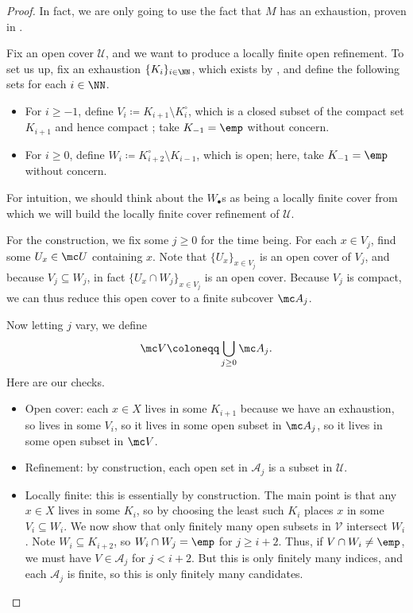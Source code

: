 \documentclass[../notes.tex]{subfiles}
\begin{document}
\begin{proof}
	In fact, we are only going to use the fact that $M$ has an exhaustion, proven in .

	Fix an open cover $\mathcal U$, and we want to produce a locally finite open refinement. To set us up, fix an exhaustion $\{K_i\}_{i\in\NN}$, which exists by , and define the following sets for each $i\in\NN$.
	\begin{itemize}
		\item For $i\ge-1$, define $V_i\coloneqq K_{i+1}\setminus K_i^\circ$, which is a closed subset of the compact set $K_{i+1}$ and hence compact \cite[Lemma~4.10]{elber-top}; take $K_{-1}=\emp$ without concern.
		\item For $i\ge0$, define $W_i\coloneqq K_{i+2}^\circ\setminus K_{i-1}$, which is open; here, take $K_{-1}=\emp$ without concern.
	\end{itemize}
	For intuition, we should think about the $W_\bullet$s as being a locally finite cover from which we will build the locally finite cover refinement of $\mathcal U$.

	For the construction, we fix some $j\ge0$ for the time being. For each $x\in V_j$, find some $U_x\in\mc U$ containing $x$. Note that $\{U_x\}_{x\in V_j}$  is an open cover of $V_j$, and because $V_j\subseteq W_j$, in fact $\{U_x\cap W_j\}_{x\in V_j}$ is an open cover. Because $V_j$ is compact, we can thus reduce this open cover to a finite subcover $\mc A_j$.

	Now letting $j$ vary, we define
	\[\mc V\coloneqq\bigcup_{j\ge0}\mc A_j.\]
	Here are our checks.
	\begin{itemize}
		\item Open cover: each $x\in X$ lives in some $K_{i+1}$ because we have an exhaustion, so lives in some $V_i$, so it lives in some open subset in $\mc A_j$, so it lives in some open subset in $\mc V$.
		\item Refinement: by construction, each open set in $\mathcal A_j$ is a subset in $\mathcal U$.
		\item Locally finite: this is essentially by construction. The main point is that any $x\in X$ lives in some $K_i$, so by choosing the least such $K_i$ places $x$ in some $V_i\subseteq W_i$. We now show that only finitely many open subsets in $\mathcal V$ intersect $W_i$. Note $W_i\subseteq K_{i+2}$, so $W_i\cap W_j=\emp$ for $j\ge i+2$. Thus, if $V\cap W_i\ne\emp$, we must have $V\in\mathcal A_j$ for $j<i+2$. But this is only finitely many indices, and each $\mathcal A_j$ is finite, so this is only finitely many candidates.
		\qedhere
	\end{itemize}
\end{proof}
\end{document}
